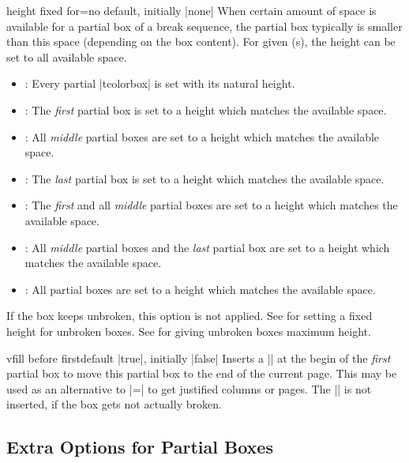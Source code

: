 \begin{docTcbKey}{height fixed for}{=}{no default, initially |none|}
  When certain amount of space is available for a partial box of a
  break sequence, the partial box typically is smaller than this space
  (depending on the box content). For given (s), the height can be
  set to all available space.
  \begin{itemize}
  \item{}: Every partial |tcolorbox| is set with its natural height.
  \item{}: The \emph{first} partial box is set to a height which matches the available space.
  \item{}: All \emph{middle} partial boxes are set to a height which matches the available space.
  \item{}: The \emph{last} partial box is set to a height which matches
    the available space.
  \item{}: The \emph{first} and
    all \emph{middle} partial boxes are set to a height which matches the available space.
  \item{}: All \emph{middle} partial boxes and the \emph{last} partial box
    are set to a height which matches the available space.
  \item{}: All partial boxes are set to a height which matches the available space.
  \end{itemize}
\begin{marker}
  If the box keeps unbroken, this option is not applied.
  See  for setting a fixed height for unbroken boxes.
  See  for giving unbroken boxes maximum height.
\end{marker}
\end{docTcbKey}


\begin{docTcbKey}{vfill before first}{}{default |true|, initially |false|}
  Inserts a |\vfill| at the begin of the \emph{first} partial box to move this
  partial box to the end of the current page. This may be used as an alternative
  to |=| to get justified
  columns or pages. The |\vfill| is not inserted, if the box gets not
  actually broken.
\end{docTcbKey}


\clearpage
\subsection{Extra Options for Partial Boxes}\label{subsec:extras}



